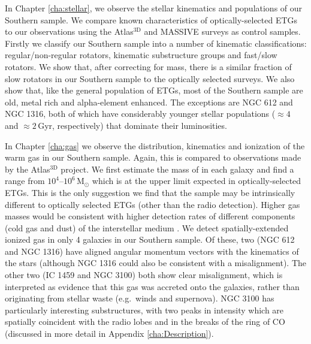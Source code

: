 In Chapter \ref{cha:stellar}, we observe the stellar kinematics and populations of our Southern sample. We compare known characteristics of optically-selected ETGs to our observations using the Atlas$^\text{3D}$ and MASSIVE surveys as control samples. Firstly we classify our Southern sample into a number of kinematic classifications: regular/non-regular rotators, kinematic substructure groups and fast/slow rotators. We show that, after correcting for mass, there is a similar fraction of slow rotators in our Southern sample to the optically selected surveys. We also show that, like the general population of ETGs, most of the Southern sample are old, metal rich and alpha-element enhanced. The exceptions are NGC 612 and NGC 1316, both of which have considerably younger stellar populations ($\approx 4$ and $\approx 2$\,Gyr, respectively) that dominate their luminosities. 

In Chapter \ref{cha:gas} we observe the distribution, kinematics and ionization of the warm gas in our Southern sample. Again, this is compared to observations made by the Atlas$^\text{3D}$ project. We first estimate the mass of  in each galaxy and find a range from $10^4$--$10^6\,\mathrm{M_\odot}$ which is at the upper limit expected in optically-selected ETGs. This is the only suggestion we find that the sample may be intrinsically different to optically selected ETGs (other than the radio detection). Higher gas masses would be consistent with higher detection rates of different components (cold gas and dust) of the interstellar medium \citep[ISM; e.g.][]{DeRuiter2002, Leon2003, VerdoesKleijn2005}. We detect spatially-extended ionized gas in only 4 galaxies in our Southern sample. Of these, two (NGC 612 and NGC 1316) have aligned angular momentum vectors with the kinematics of the stars (although NGC 1316 could also be consistent with a misalignment). The other two (IC 1459 and NGC 3100) both show clear misalignment, which is interpreted as evidence that this gas was accreted onto the galaxies, rather than originating from stellar waste (e.g.\ winds and supernova). NGC 3100 has particularly interesting substructures, with two peaks in intensity which are spatially coincident with the radio lobes and in the breaks of the ring of CO (discussed in more detail in Appendix \ref{cha:Description}). %

